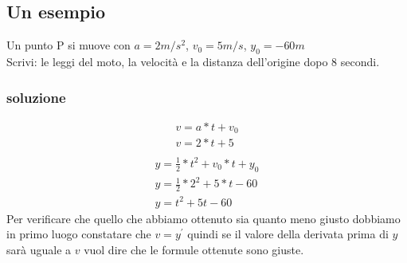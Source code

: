\subsection{Un esempio}
Un punto P si muove con $a=2m/s^2$, $v_0=5m/s$, $y_0=-60m$\\
Scrivi: le leggi del moto, la velocità e la distanza dell'origine dopo 8
secondi.
\subsubsection{soluzione}
\begin{multicols}{2}
	\begin{equation}
	\begin{matrix}
			v=a*t+v_0\\
			v=2*t+5\\
	\end{matrix}
	\end{equation}
	\begin{equation}
	\begin{matrix}
			y=\frac{1}{2}*t^2+v_0*t+y_0\\
			y=\frac{1}{2}*2^2+5*t-60\\
			y=t^2+5t-60
	\end{matrix}
	\end{equation}
	Per verificare che quello che abbiamo ottenuto sia quanto meno giusto
	dobbiamo in primo luogo constatare che $v=y^\prime$ quindi se il valore
	della derivata prima di $y$ sarà uguale a $v$ vuol dire che le formule
	ottenute sono giuste.
\end{multicols}
